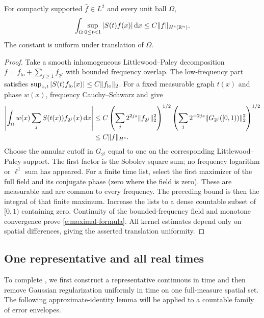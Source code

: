 \begin{theorem}
\label{e:maximal}
For compactly supported $\widehat f\in L^2$ and every unit ball $\Omega$,
\begin{equation}
 \int_\Omega\sup_{0\le t<1}|S(t)f(x)|\,\mathrm d x
       \le C\lVert f\rVert_{H^s(\mathbb R^n)}.
 \label{e:maximal-formula}
\end{equation}
The constant is uniform under translation of $\Omega$.
\end{theorem}

\begin{proof}
Take a smooth inhomogeneous Littlewood--Paley decomposition
$f=f_{\mathrm{lo}}+\sum_{j\ge1}f_{2^j}$ with bounded frequency overlap.
The low-frequency part satisfies
$\sup_{x,t}|S(t)f_{\mathrm{lo}}(x)|\le C\lVert f_{\mathrm{lo}}\rVert_2$.
For a fixed measurable graph $t(x)$ and phase $w(x)$, frequency
Cauchy--Schwarz and  give
\begin{align*}
 \left|\int_\Omega w(x)\sum_jS(t(x))f_{2^j}(x)\,\mathrm d x\right|
 &\le C\left(\sum_j2^{2js}\lVert f_{2^j}\rVert_2^2\right)^{1/2}
        \left(\sum_j2^{-2js}\lVert G_{2^j}([0,1))\rVert_2^2\right)^{1/2}\\
 &\le C\lVert f\rVert_{H^s}.
\end{align*}
Choose the annular cutoff in $G_{2^j}$ equal to one on the corresponding
Littlewood--Paley support.  The first factor is the Sobolev square sum;
no frequency logarithm or $\ell^1$ sum has appeared.
For a finite time list, select the first maximizer of the full field
and its conjugate phase (zero where the field is zero).  These are
measurable and are common to every frequency.  The preceding bound is
then the integral of that finite maximum.  Increase the lists to a
dense countable subset of $[0,1)$ containing zero.  Continuity of the
bounded-frequency field and monotone convergence prove
\eqref{e:maximal-formula}.  All kernel estimates depend only on spatial
differences, giving the asserted translation uniformity.
\end{proof}

\subsection{One representative and all real times}
\label{e:trace}

To complete , we first construct a representative continuous
in time and then remove Gaussian regularization uniformly in time on
one full-measure spatial set.  The following approximate-identity lemma
will be applied to a countable family of error envelopes.

